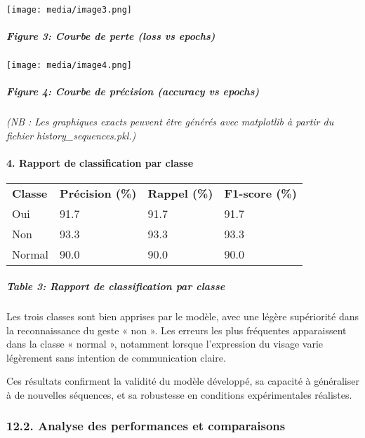 \documentclass[
]{article}
\begin{document}
\texttt{[image: media/image3.png]}

\hypertarget{figure-3-courbe-de-perte-loss-vs-epochs}{%
\subparagraph{Figure 3: Courbe de perte (loss vs epochs)}\label{figure-3-courbe-de-perte-loss-vs-epochs}}

\texttt{[image: media/image4.png]}

\hypertarget{figure-4-courbe-de-pruxe9cision-accuracy-vs-epochs}{%
\subparagraph{Figure 4: Courbe de précision (accuracy vs epochs)}\label{figure-4-courbe-de-pruxe9cision-accuracy-vs-epochs}}

\emph{(NB : Les graphiques exacts peuvent être générés avec matplotlib à partir du fichier history\_sequences.pkl.)}

\hypertarget{rapport-de-classification-par-classe}{%
\paragraph{\texorpdfstring{\textbf{4. Rapport de classification par classe}}{4. Rapport de classification par classe}}\label{rapport-de-classification-par-classe}}

\begin{longtable}[]{@{}llll@{}}
\toprule
\endhead
\textbf{Classe} & \textbf{Précision (\%)} & \textbf{Rappel (\%)} & \textbf{F1-score (\%)} \\
Oui & 91.7 & 91.7 & 91.7 \\
Non & 93.3 & 93.3 & 93.3 \\
Normal & 90.0 & 90.0 & 90.0 \\
\bottomrule
\end{longtable}

\hypertarget{table-3-rapport-de-classification-par-classe}{%
\subparagraph{Table 3: Rapport de classification par classe}\label{table-3-rapport-de-classification-par-classe}}

Les trois classes sont bien apprises par le modèle, avec une légère supériorité dans la reconnaissance du geste « non ». Les erreurs les plus fréquentes apparaissent dans la classe « normal », notamment lorsque l'expression du visage varie légèrement sans intention de communication claire.

Ces résultats confirment la validité du modèle développé, sa capacité à généraliser à de nouvelles séquences, et sa robustesse en conditions expérimentales réalistes.

\hypertarget{analyse-des-performances-et-comparaisons}{%
\subsubsection{12.2. Analyse des performances et comparaisons}\label{analyse-des-performances-et-comparaisons}}
\end{document}

